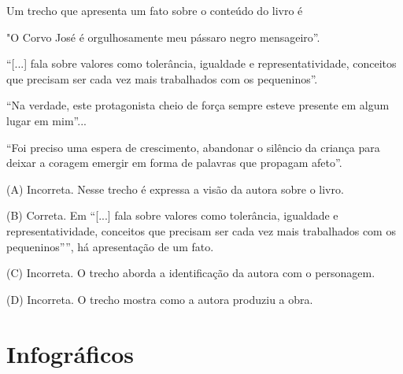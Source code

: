 \begin{escolha}
\begin{escolha}
{Um trecho que apresenta um fato sobre o conteúdo do livro é

\begin{escolha}
\item "O Corvo José é orgulhosamente meu pássaro negro mensageiro''.

\item ``{[}...{]} fala sobre
valores como tolerância, igualdade e representatividade, conceitos que
precisam ser cada vez mais trabalhados com os pequeninos''.

\item ``Na verdade, este protagonista cheio de força sempre esteve
presente em algum lugar em mim''...

\item ``Foi preciso uma espera de crescimento, abandonar o silêncio da
criança para deixar a coragem emergir em forma de palavras que propagam
afeto''.
\end{escolha}


(A) Incorreta. Nesse trecho é expressa a visão da autora sobre o livro.

(B) Correta. Em ``{[}...{]} fala sobre valores como tolerância,
igualdade e representatividade, conceitos que precisam ser cada vez mais
trabalhados com os pequeninos'''', há apresentação de um fato.

(C) Incorreta. O trecho aborda a identificação da autora com o
personagem.

(D) Incorreta. O trecho mostra como a autora produziu a obra.

\chapter{Infográficos}


}
\end{escolha}
\end{escolha}
